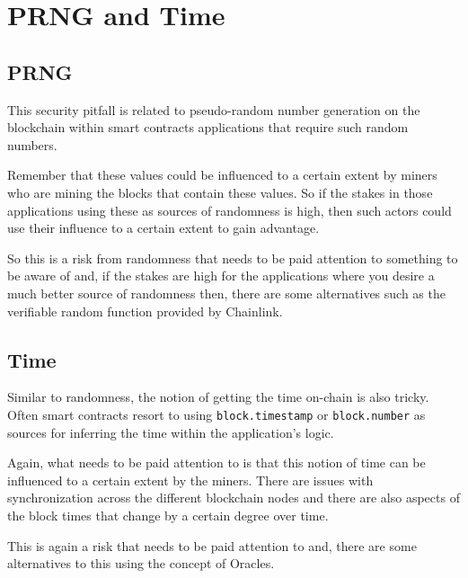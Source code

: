 \section{PRNG and Time}\label{prng-and-time}

\subsection{PRNG}\label{prng}

This security pitfall is related to pseudo-random number generation on
the blockchain within smart contracts applications that require such
random numbers.

Remember that these values could be influenced to a certain extent by
miners who are mining the blocks that contain these values. So if the
stakes in those applications using these as sources of randomness is
high, then such actors could use their influence to a certain extent to
gain advantage.

So this is a risk from randomness that needs to be paid attention to
something to be aware of and, if the stakes are high for the
applications where you desire a much better source of randomness then,
there are some alternatives such as the verifiable random function
provided by Chainlink.

\subsection{Time}\label{time}

Similar to randomness, the notion of getting the time on-chain is also
tricky. Often smart contracts resort to using \texttt{block.timestamp}
or \texttt{block.number} as sources for inferring the time within the
application's logic.

Again, what needs to be paid attention to is that this notion of time
can be influenced to a certain extent by the miners. There are issues
with synchronization across the different blockchain nodes and there are
also aspects of the block times that change by a certain degree over
time.

This is again a risk that needs to be paid attention to and, there are
some alternatives to this using the concept of Oracles.
